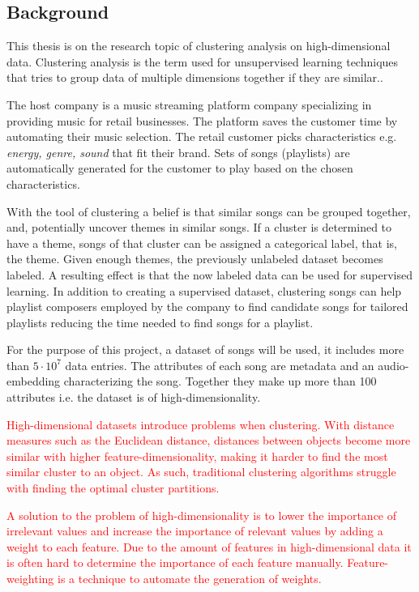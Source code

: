 \documentclass[a4paper,11pt]{article}
\begin{document}
\subsection{Background}

This thesis is on the research topic of clustering analysis on high-dimensional data. Clustering analysis is the term used for unsupervised learning
techniques that tries to group data of multiple dimensions together if
they are similar.\cite{Kaufman1990}.


The host company is a music streaming platform
company specializing in providing music for retail businesses. The
platform saves the customer time by automating their music selection. The
retail customer picks characteristics e.g. \textit{energy, genre, sound} that fit their brand. Sets of songs (playlists) are automatically generated for the customer to play based on the chosen characteristics.

With the tool of clustering a belief is that
similar songs can be grouped together, and, potentially uncover themes
in similar songs. If a cluster is determined to have a theme, songs of that
cluster can be assigned a categorical label, that is, the theme. Given
enough themes, the previously unlabeled dataset becomes labeled. A resulting effect is
that the now labeled data can be used for supervised learning. In addition to creating a supervised dataset, clustering songs can help playlist composers employed by the company to find candidate songs for tailored playlists reducing the time needed to find songs for a playlist.

For the purpose of this project, a dataset of songs will be used, it includes more than $5\cdot10^7$ data entries. The attributes of each song are metadata and an audio-embedding characterizing the song. Together they make up more than 100 attributes i.e. the dataset is of high-dimensionality.

\textcolor{red}{
High-dimensional datasets introduce problems when clustering. With distance measures such as the Euclidean distance, distances between objects become more similar with higher feature-dimensionality, making it harder to find the most similar cluster to an object. As such, traditional clustering algorithms struggle with finding the optimal cluster partitions. }

\textcolor{red}{
A solution to the problem of high-dimensionality is to lower the importance of irrelevant values and increase the importance of relevant values by adding a weight to each feature. Due to the amount of features in high-dimensional data it is often hard to determine the importance of each feature manually. Feature-weighting is a technique to automate the generation of weights.
}
\end{document}
